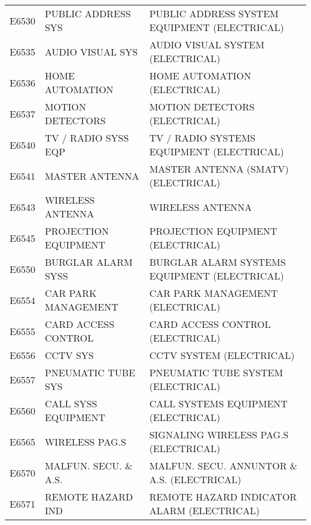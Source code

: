 \begin{longtable}[l]{l%
                  l|%
                  l|}
\rowcolor{thetableheadbgcolor!0.25!white} E6530       & PUBLIC ADDRESS SYS   & PUBLIC ADDRESS SYSTEM EQUIPMENT (ELECTRICAL)   \\
\rowcolor{thetableheadbgcolor!0.25!white} E6535       & AUDIO VISUAL SYS   & AUDIO VISUAL SYSTEM (ELECTRICAL)   \\
\rowcolor{thetableheadbgcolor!0.25!white} E6536       & HOME AUTOMATION   & HOME AUTOMATION (ELECTRICAL)   \\
\rowcolor{thetableheadbgcolor!0.25!white} E6537       & MOTION DETECTORS   & MOTION DETECTORS (ELECTRICAL)   \\
\rowcolor{thetableheadbgcolor!0.25!white} E6540       & TV / RADIO SYSS EQP   & TV / RADIO SYSTEMS EQUIPMENT (ELECTRICAL)   \\
\rowcolor{thetableheadbgcolor!0.25!white} E6541       & MASTER ANTENNA   & MASTER ANTENNA (SMATV) (ELECTRICAL)   \\
\rowcolor{thetableheadbgcolor!0.25!white} E6543       & WIRELESS ANTENNA   & WIRELESS ANTENNA   \\
\rowcolor{thetableheadbgcolor!0.25!white} E6545       & PROJECTION EQUIPMENT   & PROJECTION EQUIPMENT (ELECTRICAL)   \\
\rowcolor{thetableheadbgcolor!0.25!white} E6550       & BURGLAR ALARM SYSS   & BURGLAR ALARM SYSTEMS EQUIPMENT (ELECTRICAL)   \\
\rowcolor{thetableheadbgcolor!0.25!white} E6554       & CAR PARK MANAGEMENT   & CAR PARK MANAGEMENT  (ELECTRICAL)   \\
\rowcolor{thetableheadbgcolor!0.25!white} E6555       & CARD ACCESS CONTROL   & CARD ACCESS CONTROL (ELECTRICAL)   \\
\rowcolor{thetableheadbgcolor!0.25!white} E6556       & CCTV SYS   & CCTV SYSTEM (ELECTRICAL)   \\
\rowcolor{thetableheadbgcolor!0.25!white} E6557       & PNEUMATIC TUBE SYS   & PNEUMATIC TUBE SYSTEM (ELECTRICAL)   \\
\rowcolor{thetableheadbgcolor!0.25!white} E6560       & CALL SYSS EQUIPMENT   & CALL SYSTEMS EQUIPMENT (ELECTRICAL)   \\
\rowcolor{thetableheadbgcolor!0.25!white} E6565       & WIRELESS PAG.S   & SIGNALING WIRELESS PAG.S (ELECTRICAL)   \\
\rowcolor{thetableheadbgcolor!0.25!white} E6570       & MALFUN. SECU. \& A.S.   & MALFUN. SECU. ANNUNTOR \& A.S. (ELECTRICAL)   \\
\rowcolor{thetableheadbgcolor!0.25!white} E6571       & REMOTE HAZARD IND   & REMOTE HAZARD INDICATOR ALARM (ELECTRICAL)   \\

\end{longtable}
